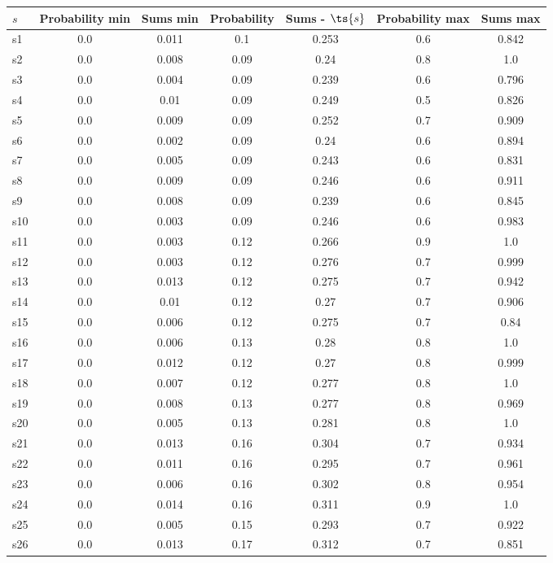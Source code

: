 \documentclass{article}
\begin{document}
\noindent\begin{tabular}{|l|c|c|c|c|c|c|}
\hline
$s$& Probability min & Sums min & Probability & Sums - $\ts{s}$ & Probability max & Sums max\\
\hline
s1 &0.0 & 0.011 & 0.1 & 0.253 & 0.6 & 0.842\\
\hline
s2 &0.0 & 0.008 & 0.09 & 0.24 & 0.8 & 1.0\\
\hline
s3 &0.0 & 0.004 & 0.09 & 0.239 & 0.6 & 0.796\\
\hline
s4 &0.0 & 0.01 & 0.09 & 0.249 & 0.5 & 0.826\\
\hline
s5 &0.0 & 0.009 & 0.09 & 0.252 & 0.7 & 0.909\\
\hline
s6 &0.0 & 0.002 & 0.09 & 0.24 & 0.6 & 0.894\\
\hline
s7 &0.0 & 0.005 & 0.09 & 0.243 & 0.6 & 0.831\\
\hline
s8 &0.0 & 0.009 & 0.09 & 0.246 & 0.6 & 0.911\\
\hline
s9 &0.0 & 0.008 & 0.09 & 0.239 & 0.6 & 0.845\\
\hline
s10 &0.0 & 0.003 & 0.09 & 0.246 & 0.6 & 0.983\\
\hline
s11 &0.0 & 0.003 & 0.12 & 0.266 & 0.9 & 1.0\\
\hline
s12 &0.0 & 0.003 & 0.12 & 0.276 & 0.7 & 0.999\\
\hline
s13 &0.0 & 0.013 & 0.12 & 0.275 & 0.7 & 0.942\\
\hline
s14 &0.0 & 0.01 & 0.12 & 0.27 & 0.7 & 0.906\\
\hline
s15 &0.0 & 0.006 & 0.12 & 0.275 & 0.7 & 0.84\\
\hline
s16 &0.0 & 0.006 & 0.13 & 0.28 & 0.8 & 1.0\\
\hline
s17 &0.0 & 0.012 & 0.12 & 0.27 & 0.8 & 0.999\\
\hline
s18 &0.0 & 0.007 & 0.12 & 0.277 & 0.8 & 1.0\\
\hline
s19 &0.0 & 0.008 & 0.13 & 0.277 & 0.8 & 0.969\\
\hline
s20 &0.0 & 0.005 & 0.13 & 0.281 & 0.8 & 1.0\\
\hline
s21 &0.0 & 0.013 & 0.16 & 0.304 & 0.7 & 0.934\\
\hline
s22 &0.0 & 0.011 & 0.16 & 0.295 & 0.7 & 0.961\\
\hline
s23 &0.0 & 0.006 & 0.16 & 0.302 & 0.8 & 0.954\\
\hline
s24 &0.0 & 0.014 & 0.16 & 0.311 & 0.9 & 1.0\\
\hline
s25 &0.0 & 0.005 & 0.15 & 0.293 & 0.7 & 0.922\\
\hline
s26 &0.0 & 0.013 & 0.17 & 0.312 & 0.7 & 0.851\\

\end{tabular}
\end{document}
